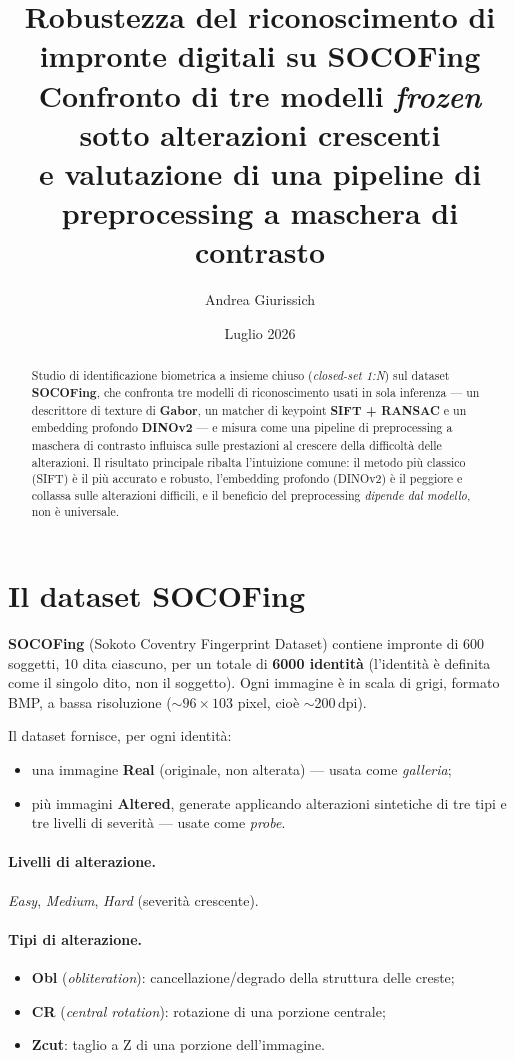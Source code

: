 \documentclass[11pt,a4paper]{article}
\title{\textbf{Robustezza del riconoscimento di impronte digitali su SOCOFing}\\
\large Confronto di tre modelli \emph{frozen} sotto alterazioni crescenti\\
e valutazione di una pipeline di preprocessing a maschera di contrasto}
\author{Andrea Giurissich}
\date{Luglio 2026}
\begin{document}
\maketitle

\begin{abstract}
\noindent
Studio di identificazione biometrica a insieme chiuso (\emph{closed-set 1:N}) sul
dataset \textbf{SOCOFing}, che confronta tre modelli di riconoscimento usati in
sola inferenza --- un descrittore di texture di \textbf{Gabor}, un matcher di
keypoint \textbf{SIFT + RANSAC} e un embedding profondo \textbf{DINOv2} --- e
misura come una pipeline di preprocessing a maschera di contrasto influisca sulle
prestazioni al crescere della difficolt\`a delle alterazioni. Il risultato
principale ribalta l'intuizione comune: il metodo pi\`u classico (SIFT) \`e il pi\`u
accurato e robusto, l'embedding profondo (DINOv2) \`e il peggiore e collassa sulle
alterazioni difficili, e il beneficio del preprocessing \emph{dipende dal
modello}, non \`e universale.
\end{abstract}

\section{Il dataset SOCOFing}

\textbf{SOCOFing} (Sokoto Coventry Fingerprint Dataset) contiene impronte di
\num{600} soggetti, \num{10} dita ciascuno, per un totale di \textbf{\num{6000}
identit\`a} (l'identit\`a \`e definita come il singolo dito, non il soggetto). Ogni
immagine \`e in scala di grigi, formato BMP, a bassa risoluzione (\(\sim\)\(96\times103\)
pixel, cio\`e \(\sim\)200\,dpi).

Il dataset fornisce, per ogni identit\`a:
\begin{itemize}
  \item una immagine \textbf{Real} (originale, non alterata) --- usata come
        \emph{galleria};
  \item pi\`u immagini \textbf{Altered}, generate applicando alterazioni sintetiche
        di tre tipi e tre livelli di severit\`a --- usate come \emph{probe}.
\end{itemize}

\paragraph{Livelli di alterazione.} \emph{Easy}, \emph{Medium}, \emph{Hard}
(severit\`a crescente).

\paragraph{Tipi di alterazione.}
\begin{itemize}
  \item \textbf{Obl} (\emph{obliteration}): cancellazione/degrado della struttura
        delle creste;
  \item \textbf{CR} (\emph{central rotation}): rotazione di una porzione centrale;
  \item \textbf{Zcut}: taglio a Z di una porzione dell'immagine.
\end{itemize}
\end{document}
